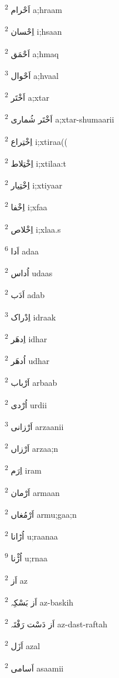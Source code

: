 \documentclass[12pt]{article}
\begin{document}
\begin{multicols}{5}
{\ur اَحْرام}   \textsuperscript{2} a;hraam

{\ur اِحْسان}   \textsuperscript{2} i;hsaan

{\ur اَحْمَق}   \textsuperscript{2} a;hmaq

{\ur اَحْوال}   \textsuperscript{3} a;hvaal

{\ur اَخْتَر}   \textsuperscript{2} a;xtar

{\ur اَخْتَر شُماری}   \textsuperscript{2} a;xtar-shumaarii

{\ur اِخْتِراع}   \textsuperscript{2} i;xtiraa((

{\ur اِخْتِلاط}   \textsuperscript{2} i;xtilaa:t

{\ur اِخْتِیار}   \textsuperscript{2} i;xtiyaar

{\ur اِخْفا}   \textsuperscript{2} i;xfaa

{\ur اِخْلاص}   \textsuperscript{2} i;xlaa.s

{\ur اَدا}   \textsuperscript{6} adaa

{\ur اُداس}   \textsuperscript{2} udaas

{\ur اَدَب}   \textsuperscript{2} adab

{\ur اِدْراک}   \textsuperscript{3} idraak

{\ur اِدھَر}   \textsuperscript{2} idhar

{\ur اُدھَر}   \textsuperscript{2} udhar

{\ur اَرْباب}   \textsuperscript{2} arbaab

{\ur اُرْدی}   \textsuperscript{2} urdii

{\ur اَرْزانی}   \textsuperscript{3} arzaanii

{\ur اَرْزاں}   \textsuperscript{2} arzaa;n

{\ur اِرَم}   \textsuperscript{2} iram

{\ur اَرْمان}   \textsuperscript{2} armaan

{\ur اَرْمُغاں}   \textsuperscript{2} armu;gaa;n

{\ur اُڑانا}   \textsuperscript{2} u;raanaa

{\ur اُڑْنا}   \textsuperscript{9} u;rnaa

{\ur اَز}   \textsuperscript{2} az

{\ur اَز بَسْکِہ}   \textsuperscript{2} az-baskih

{\ur اَز دَسْت رَفْتَہ}   \textsuperscript{2} az-dast-raftah

{\ur اَزَل}   \textsuperscript{2} azal

{\ur اَسامی}   \textsuperscript{2} asaamii


\end{multicols}
\end{document}
